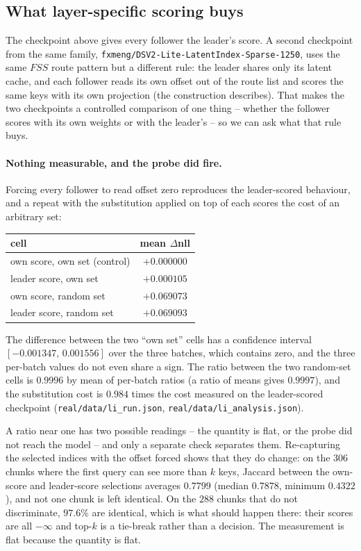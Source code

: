 \documentclass[10pt]{article}
\begin{document}
\subsection{What layer-specific scoring buys}
\label{sec:latentindex}

The checkpoint above gives every follower the leader's score. A second
checkpoint from the same family, \texttt{fxmeng/DSV2-Lite-LatentIndex-Sparse-1250},
uses the same $FSS$ route pattern but a different rule: the leader shares only
its latent cache, and each follower reads its own offset out of the route list
and scores the same keys with its own projection (the construction
\citet{latentindex} describes). That makes the two checkpoints a controlled
comparison of one thing -- whether the follower scores with its own weights or
with the leader's -- so we can ask what that rule buys.

\paragraph{Nothing measurable, and the probe did fire.} Forcing every follower
to read offset zero reproduces the leader-scored behaviour, and a repeat with
the substitution applied on top of each scores the cost of an arbitrary set:

\begin{center}
\begin{tabular}{lc}
\toprule
cell & mean $\Delta$nll \\
\midrule
own score, own set (control) & $+0.000000$ \\
leader score, own set & $+0.000105$ \\
own score, random set & $+0.069073$ \\
leader score, random set & $+0.069093$ \\
\bottomrule
\end{tabular}
\end{center}

The difference between the two ``own set'' cells has a confidence interval
$[-0.001347,\,0.001556]$ over the three batches, which contains zero, and the
three per-batch values do not even share a sign. The ratio between the two
random-set cells is $0.9996$ by mean of per-batch ratios (a ratio of means
gives $0.9997$), and the substitution cost is $0.984$ times the cost measured
on the leader-scored checkpoint
(\texttt{real/data/li\_run.json}, \texttt{real/data/li\_analysis.json}).

A ratio near one has two possible readings -- the quantity is flat, or the
probe did not reach the model -- and only a separate check separates them.
Re-capturing the selected indices with the offset forced shows that they do
change: on the $306$ chunks where the first query can see more than $k$ keys,
Jaccard between the own-score and leader-score selections averages $0.7799$
(median $0.7878$, minimum $0.4322$), and not one chunk is left identical. On
the $288$ chunks that do not discriminate, $97.6\%$ are identical, which is
what should happen there: their scores are all $-\infty$ and top-$k$ is a
tie-break rather than a decision. The measurement is flat because the quantity
is flat.
\end{document}
